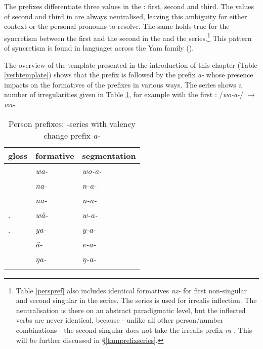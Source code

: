 The prefixes differentiate three  values in the : first, second and third. The values of second and third  in  are always neutralised, leaving this ambiguity for either context or the personal pronouns to resolve. The same holds true for the syncretism between the first  and the second  in the \Alph{} and the \Gam{} series.\footnote{Table \ref{perspref} also includes identical formatives \emph{nz-} for first non-singular and second singular in the \Bet{} series. The \Bet{} series is used for irrealis inflection. The neutralisation is there on an abstract paradigmatic level, but the inflected verbs are never identical, because - unlike all other person/number combinations - the second singular does not take the irrealis prefix \emph{ra-}. This will be further discussed in \S{}\ref{tamprefixseries}.} This pattern of syncretism is found in languages across the Yam family (\citealt{Evans:sng}).%

The overview of the  template presented in the introduction of this chapter (Table \ref{verbtemplate}) shows that the  prefix is followed by the  prefix \emph{a-} whose presence impacts on the formatives of the  prefixes in various ways. The \Alph{} series shows a number of irregularities given in Table \ref{persprefwithvalencychange}, for example with the first : /\emph{wo-a-}/ $\rightarrow$ \emph{wa-}.

\begin{table}
\caption{Person prefixes: \Alph-series with valency change prefix \emph{a-}}
\label{persprefwithvalencychange}
	\begin{tabular}{lll}
		\lsptoprule
		{gloss} &{formative} &{segmentation}\\\midrule
		\Fsg &\emph{wa-} &\emph{wo-a-}\\
		\Fnsg &\emph{na-} &\emph{n-a-}\\
		\Ssg &\emph{na-} &\emph{n-a-}\\
		\Tsg.\F	&\emph{wä-} &\emph{w-a-}\\
		\Tsg.\Masc &\emph{ya-} &\emph{y-a-}\\
		\Stnsg &\emph{ä-} &\emph{e-a-}\footnotemark\\
		\M &\emph{ŋa-} &\emph{ŋ-a-}\\
		\lspbottomrule
	\end{tabular}
\end{table}%

